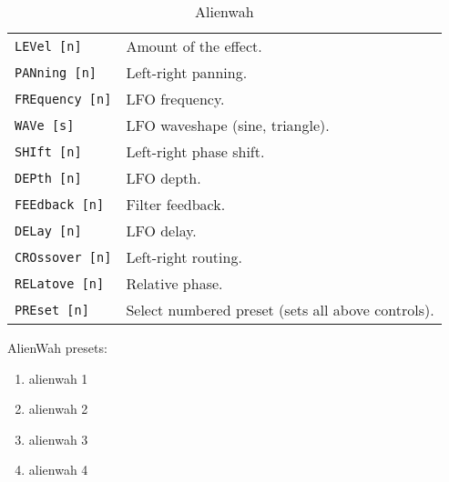   \begin{table}[H]
      \centering
      \caption{Alienwah}
      \begin{tabular}{l l}
\texttt{LEVel [n]} &
   Amount of the effect. \\
\texttt{PANning [n]} &
   Left-right panning. \\
\texttt{FREquency [n]} &
   LFO frequency. \\
\texttt{WAVe [s]} &
   LFO waveshape (sine, triangle). \\
\texttt{SHIft [n]} &
   Left-right phase shift. \\
\texttt{DEPth [n]} &
   LFO depth. \\
\texttt{FEEdback [n]} &
   Filter feedback. \\
\texttt{DELay [n]} &
   LFO delay. \\
\texttt{CROssover [n]} &
   Left-right routing. \\
\texttt{RELatove [n]} &
   Relative phase. \\
\texttt{PREset [n]} &
   Select numbered preset (sets all above controls). \\
      \end{tabular}
   \end{table}
AlienWah presets:
   \begin{enumerate}
   \item alienwah 1
   \item alienwah 2
   \item alienwah 3
   \item alienwah 4
   \end{enumerate}

